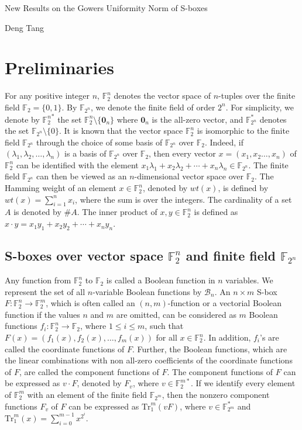 \documentclass[12 pt]{article}
\def\F{{\mathbb F}}
\begin{document}


\begin{center}
\Large{New Results on the  Gowers Uniformity Norm of S-boxes}
\end{center}

\begin{center}
Deng Tang
\end{center}

\section{Preliminaries}
\label{sec-prel}
For any positive integer $n$, $\F_2^n$ denotes the vector space of $n$-tuples over the finite field $\F_2=\{0,1\}$. By $\F_{2^n}$, we denote the finite field of order $2^n$.
For simplicity, we denote by ${\F_2^n}^\ast$ the set $\F_2^{n}\setminus\{\mathbf{0}_n\}$ where $\mathbf{0}_n$ is the all-zero vector, and $\F_{2^n}^*$ denotes the set $\F_{2^n}\setminus\{0\}$. It is known that the vector space
$\F_2^n$ is isomorphic to the finite field $\F_{2^n}$ through the choice of some basis of $\F_{2^n}$ over $\F_2$. Indeed, if $(\lambda_1, \lambda_2, \ldots, \lambda_n)$ is a basis of
$\F_{2^n}$ over $\F_2$, then every vector $x = (x_1,x_2\ldots,x_n)$ of $\F_2^n$ can be identified with the element $x_1\lambda_1+x_2\lambda_2+\cdots+x_n\lambda_n\in\F_{2^n}$. The finite
field $\F_{2^n}$ can then be viewed as an $n$-dimensional vector space over $\F_2$. The Hamming weight of an element $x\in\mathbb F_2^n$, denoted by $wt(x)$, is defined by
$wt(x)=\sum_{i=1}^nx_i$, where the sum is over the integers. The cardinality of a set $A$ is denoted by $\#A$. The inner product of $x, y \in \mathbb F_2^n$ is defined as
$x\cdot y=x_1y_1+x_2y_2+\cdots+x_ny_n$.

\subsection{S-boxes over vector space $\F_2^n$ and finite field $\F_{2^n}$}
Any function from $\mathbb F_2^n$ to $\mathbb F_2$ is called a Boolean function in $n$ variables. We represent the set of all $n$-variable Boolean functions by $\mathcal{B}_n$.
An $n\times m$ S-box $F: \F_2^n\rightarrow \F_2^m$, which is often called an $(n,m)$-function or a vectorial Boolean function if the values $n$ and $m$ are omitted, can be considered as
$m$ Boolean functions $f_i: \mathbb{F}_2^n\rightarrow \F_2$, where $1\le i\le m$, such that $F(x) = (f_1(x), f_2(x), \ldots, f_m(x))$ for all $x\in\mathbb{F}_2^n$. In addition, $f_i$'s are called
the coordinate functions of $F$. Further, the Boolean functions, which are the linear combinations with non all-zero coefficients of the coordinate functions of $F$, are called the component
functions of $F$. The component functions of $F$ can be expressed as $v \cdot F$, denoted by $F_v$, where $v \in\F_2^{m*}$. If we identify every element of $\F_2^m$ with an element of the finite
field $\F_{2^m}$, then the nonzero component functions $F_v$ of $F$ can be expressed as $\mathrm{Tr}_1^m(v F)$, where $v\in\F_{2^m}^*$ and $\mathrm{Tr}_1^m(x)=\sum_{i=0}^{m-1} x^{2^i}$.
\end{document}
